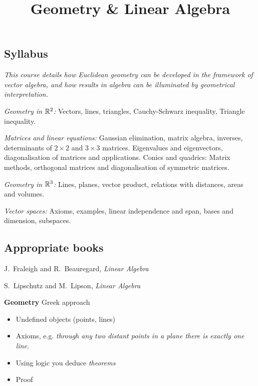 \documentclass[10pt]{scrartcl}
\title{Geometry \& Linear Algebra}
\begin{document}
{


\subsection*{Syllabus}

\textit{This course details how Euclidean geometry can be developed in the framework of vector algebra, and how results in algebra can be illuminated by geometrical interpretation.}

\emph{Geometry in $\mathbb{R}^2$:}  Vectors, lines, triangles, Cauchy-Schwarz inequality, Triangle inequality. 

\emph{Matrices and linear equations:} Gaussian elimination, matrix algebra, inverses, determinants of $2\times2$ and $3\times3$ matrices. Eigenvalues and eigenvectors, diagonalisation of matrices and applications.
Conics and quadrics: Matrix methods, orthogonal matrices and diagonalisation of symmetric
matrices.


\emph{Geometry in $\mathbb{R}^3$:} Lines, planes, vector product, relations with distances, areas and
volumes.


\emph{Vector spaces:}
Axioms, examples, linear independence and span, bases and dimension,
subspaces.


\subsection*{Appropriate books}

{\shortskip
J.~Fraleigh and R.~Beauregard, \emph{Linear Algebra}

S.~Lipschutz and M.~Lipson, \emph{Linear Algebra}
}}



\TableofContents



\setcounter{section}{-1}
\setcounter{lecture}{-1}


 \setcounter{page}{3}

\textbf{Geometry} Greek approach 

 \begin{itemize}
 \item Undefined objects (points, lines)
 \item Axioms, e.g. \emph{through any two distant points in a plane there is exactly one line.}
 \item Using logic you deduce \emph{theorems}
 \item Proof
 \end{itemize}\vspace*{5pt}
 
\end{document}

